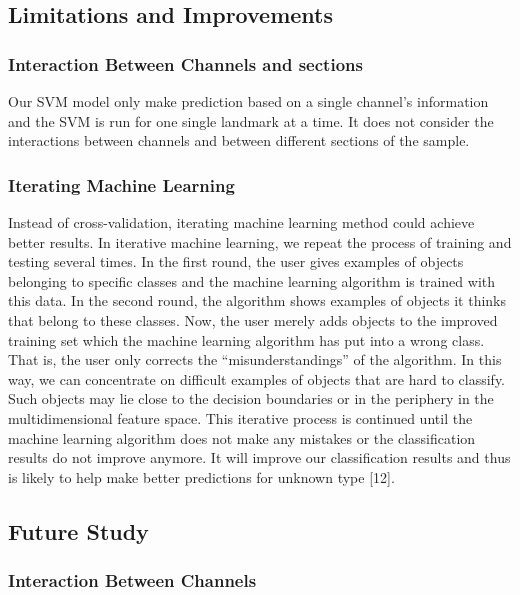 \documentclass[10pt,letterpaper]{article}
\begin{document}
\subsection{Limitations and
Improvements}\label{limitations-and-improvements}

\subsubsection{Interaction Between Channels and
sections}\label{interaction-between-channels-and-sections}

Our SVM model only make prediction based on a single channel's
information and the SVM is run for one single landmark at a time. It
does not consider the interactions between channels and between
different sections of the sample.

\subsubsection{Iterating Machine
Learning}\label{iterating-machine-learning}

Instead of cross-validation, iterating machine learning method could
achieve better results. In iterative machine learning, we repeat the
process of training and testing several times. In the first round, the
user gives examples of objects belonging to specific classes and the
machine learning algorithm is trained with this data. In the second
round, the algorithm shows examples of objects it thinks that belong to
these classes. Now, the user merely adds objects to the improved
training set which the machine learning algorithm has put into a wrong
class. That is, the user only corrects the ``misunderstandings'' of the
algorithm. In this way, we can concentrate on difficult examples of
objects that are hard to classify. Such objects may lie close to the
decision boundaries or in the periphery in the multidimensional feature
space. This iterative process is continued until the machine learning
algorithm does not make any mistakes or the classification results do
not improve anymore. It will improve our classification results and thus
is likely to help make better predictions for unknown type {[}12{]}.

\subsection{Future Study}\label{future-study}

\subsubsection{Interaction Between
Channels}\label{interaction-between-channels}
\end{document}
